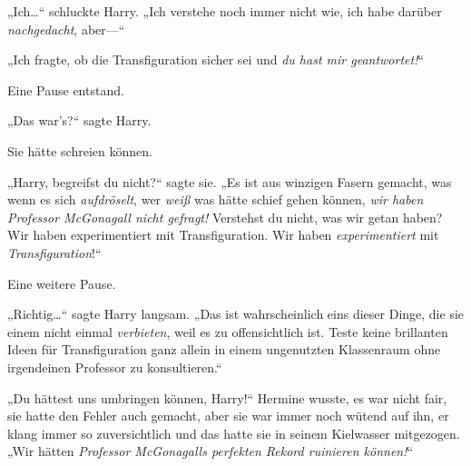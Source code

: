 „Ich…“ schluckte Harry. „Ich verstehe noch immer nicht wie, ich habe darüber \emph{nachgedacht}, aber—“

„Ich fragte, ob die Transfiguration sicher sei und \emph{du hast mir geantwortet!}“

Eine Pause entstand.

„Das war’s?“ sagte Harry.

Sie hätte schreien können.

„Harry, begreifst du nicht?“ sagte sie. „Es ist aus winzigen Fasern gemacht, was wenn es sich \emph{aufdröselt}, wer \emph{weiß} was hätte schief gehen können, \emph{wir haben Professor McGonagall nicht gefragt!} Verstehst du nicht, was wir getan haben? Wir haben experimentiert mit Transfiguration. Wir haben \emph{experimentiert} mit \emph{Transfiguration}!“

Eine weitere Pause.

„Richtig…“ sagte Harry langsam. „Das ist wahrscheinlich eins dieser Dinge, die sie einem nicht einmal \emph{verbieten}, weil es zu offensichtlich ist. Teste keine brillanten Ideen für Transfiguration ganz allein in einem ungenutzten Klassenraum ohne irgendeinen Professor zu konsultieren.“

„Du hättest uns umbringen können, Harry!“ Hermine wusste, es war nicht fair, sie hatte den Fehler auch gemacht, aber sie war immer noch wütend auf ihn, er klang immer so zuversichtlich und das hatte sie in seinem Kielwasser mitgezogen. „Wir hätten \emph{Professor McGonagalls perfekten Rekord ruinieren können!}“

